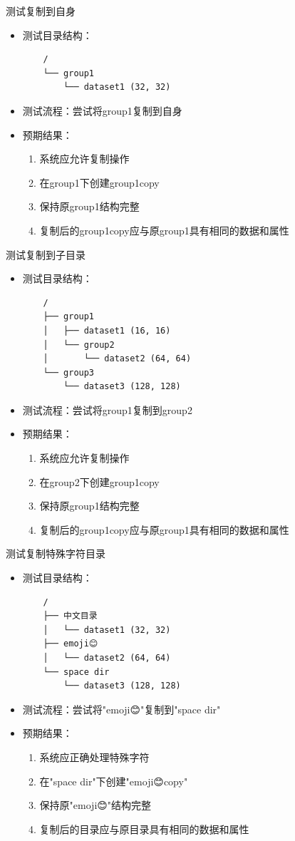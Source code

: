 \documentclass[a4paper,12pt]{report}	%
\begin{document}
测试复制到自身
\begin{itemize}
    \item 测试目录结构：
    \begin{verbatim}
    /
    └── group1
        └── dataset1 (32, 32)
    \end{verbatim}
    \item 测试流程：尝试将group1复制到自身
    \item 预期结果：
    \begin{enumerate}
        \item 系统应允许复制操作
        \item 在group1下创建group1\textunderscore copy
        \item 保持原group1结构完整
        \item 复制后的group1\textunderscore copy应与原group1具有相同的数据和属性
    \end{enumerate}
\end{itemize}

测试复制到子目录
\begin{itemize}
    \item 测试目录结构：
    \begin{verbatim}
    /
    ├── group1
    │   ├── dataset1 (16, 16)
    │   └── group2
    │       └── dataset2 (64, 64)
    └── group3
        └── dataset3 (128, 128)
    \end{verbatim}
    \item 测试流程：尝试将group1复制到group2
    \item 预期结果：
    \begin{enumerate}
        \item 系统应允许复制操作
        \item 在group2下创建group1\textunderscore copy
        \item 保持原group1结构完整
        \item 复制后的group1\textunderscore copy应与原group1具有相同的数据和属性
    \end{enumerate}
\end{itemize}

测试复制特殊字符目录
\begin{itemize}
    \item 测试目录结构：
    \begin{verbatim}
    /
    ├── 中文目录
    │   └── dataset1 (32, 32)
    ├── emoji😊
    │   └── dataset2 (64, 64)
    └── space dir
        └── dataset3 (128, 128)
    \end{verbatim}
    \item 测试流程：尝试将"emoji😊"复制到"space dir"
    \item 预期结果：
    \begin{enumerate}
        \item 系统应正确处理特殊字符
        \item 在"space dir"下创建"emoji😊\textunderscore copy"
        \item 保持原"emoji😊"结构完整
        \item 复制后的目录应与原目录具有相同的数据和属性
    \end{enumerate}
\end{itemize}
\end{document}
